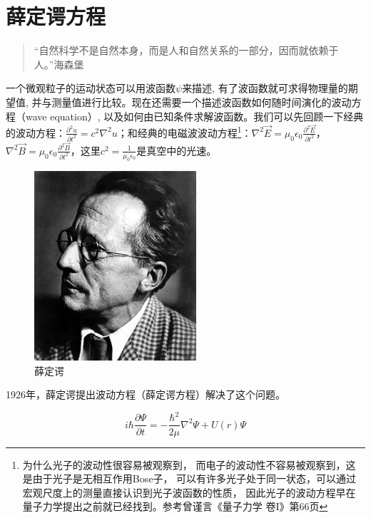 \section{薛定谔方程}

\begin{quotation}
``自然科学不是自然本身，而是人和自然关系的一部分，因而就依赖于人。''\qquad 海森堡
\end{quotation}

一个微观粒子的运动状态可以用波函数$\psi $来描述,
有了波函数就可求得物理量的期望值,
并与测量值进行比较。现在还需要一个描述波函数如何随时间演化的波动方程（wave
equation）,
以及如何由已知条件求解波函数。我们可以先回顾一下经典的波动方程：$\frac{\partial^2
u}{\partial t^2} = c^2 \nabla^2
u$；和经典的电磁波波动方程\footnote{为什么光子的波动性很容易被观察到，
而电子的波动性不容易被观察到，这是由于光子是无相互作用Bose子，
可以有许多光子处于同一状态，可以通过宏观尺度上的测量直接认识到光子波函数的性质，
因此光子的波动方程早在量子力学提出之前就已经找到。参考曾谨言《量子力学
卷I》第66页}：$\nabla^2 \vec{E} = \mu_0 \epsilon_0 \frac{\partial^2
\vec{E}}{\partial t^2}$，$\nabla^2 \vec{B} = \mu_0 \epsilon_0
\frac{\partial^2 \vec{B}}{\partial t^2}$，这里$c^2=\frac{1}{\mu_0
\epsilon_0}$是真空中的光速。


\begin{figure}[h]
\begin{center}
\includegraphics[clip,width=6cm]{SE/schrodinger.ps}
\caption{薛定谔}
\end{center}
\end{figure}

1926年，薛定谔提出波动方程（薛定谔方程）解决了这个问题。

\begin{center}
\begin{equation}\label{schrodinger eq}
    i\hbar \frac{{\partial \Psi }}{{\partial t}} =  - \frac{{\hbar ^2 }}{{2\mu }}\nabla ^2 \Psi  + U(r)\Psi
\end{equation}
\end{center}

